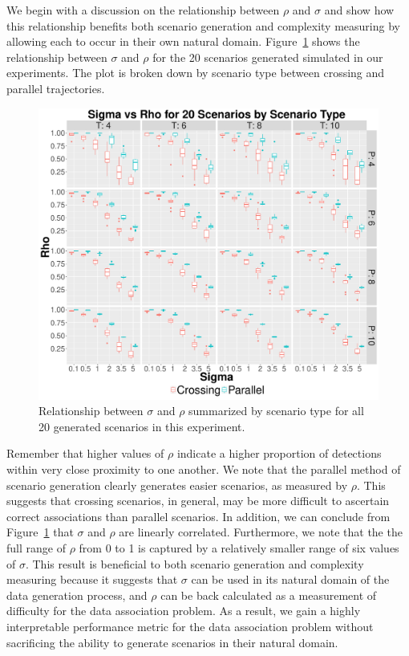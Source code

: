 We begin with a discussion on the relationship between $\rho$ and $\sigma$ and show how this relationship benefits both scenario generation and complexity measuring by allowing each to occur in their own natural domain. Figure~\ref{fig:Sigma_vs_Rho} shows the relationship between $\sigma$ and $\rho$ for the 20 scenarios generated simulated in our experiments. The plot is broken down by scenario type between crossing and parallel trajectories. 
\begin{figure}[ht]
  \centering
  \includegraphics[width=\columnwidth]{../Figures//Sigma_vs_Rho}
    \caption{Relationship between $\sigma$ and $\rho$ summarized by scenario type for all 20 generated scenarios in this experiment.}
    \label{fig:Sigma_vs_Rho}
\end{figure}

Remember that higher values of $\rho$ indicate a higher proportion of detections within very close proximity to one another. We note that the parallel method of scenario generation clearly generates easier scenarios, as measured by $\rho$. This suggests that crossing scenarios, in general, may be more difficult to ascertain correct associations than parallel scenarios. In addition, we can conclude from Figure~\ref{fig:Sigma_vs_Rho} that $\sigma$ and $\rho$ are linearly correlated. Furthermore, we note that the the full range of $\rho$ from 0 to 1 is captured by a relatively smaller range of six values of $\sigma$. This result is beneficial to both scenario generation and complexity measuring because it suggests that $\sigma$ can be used in its natural domain of the data generation process, and $\rho$ can be back calculated as a measurement of difficulty for the data association problem. As a result, we gain a highly interpretable performance metric for the data association problem without sacrificing the ability to generate scenarios in their natural domain. 

